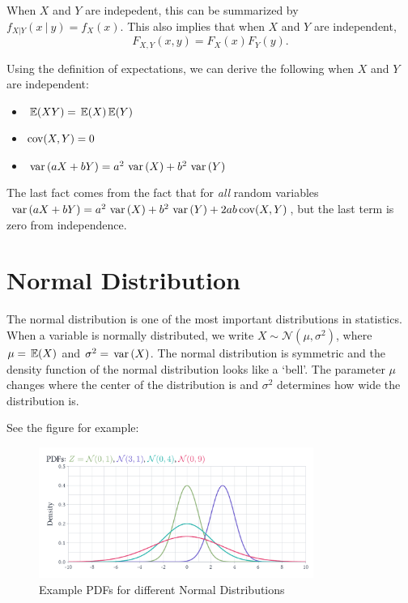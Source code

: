 \documentclass[12pt]{article}
\begin{document}
When $X$ and $Y$ are indepedent, this can be summarized by $f_{X \vert Y}(x \ \vert \ y) = f_{X}(x)$. This also implies that when $X$ and $Y$ are independent,
$$
  F_{X,Y}(x, y) = F_{X}(x) F_{Y}(y).
$$

Using the definition of expectations, we can derive the following when $X$ and $Y$ are independent:
\begin{itemize}
  \item $\expec{XY} = \expec{X} \expec{Y}$
  \item $\cov(X, Y) = 0$
  \item $\var{aX + bY} = a^2 \var{X} + b^2 \var{Y}$
\end{itemize}

The last fact comes from the fact that for \emph{all} random variables $\var{aX + bY} = a^2 \var{X} + b^2 \var{Y} + 2ab \cov(X, Y)$, but the last term is zero from independence.


\section{Normal Distribution}

The normal distribution is one of the most important distributions in statistics. When a variable is normally distributed, we write $X \sim \mathcal{N}(\mu, \sigma^2)$, where $\mu = \expec{X}$ and $\sigma^2 = \var{X}$. The normal distribution is symmetric and the density function of the normal distribution looks like a `bell'. The parameter $\mu$ changes where the center of the distribution is and $\sigma^2$ determines how wide the distribution is.


See the figure for example: 
\begin{figure}
  \caption{Example PDFs for different Normal Distributions}
  \begin{center}
    \includegraphics[width=0.8\textwidth]{figures/ex_normal_dist.pdf}
  \end{center}
\end{figure}
\end{document}
